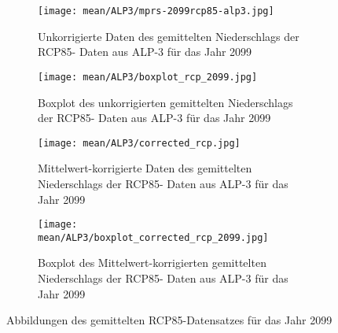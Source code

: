 \begin{figure}[hbt!]
	\begin{subfigure}{0.49\textwidth}
		\texttt{[image: mean/ALP3/mprs-2099rcp85-alp3.jpg]}
		\caption{Unkorrigierte Daten des gemittelten Niederschlags der RCP85- Daten aus ALP-3 für das Jahr 2099}
		\label{fig:rcp}
	\end{subfigure}
	\begin{subfigure}{0.49\textwidth}
		\texttt{[image: mean/ALP3/boxplot\_rcp\_2099.jpg]}
		\caption{Boxplot des unkorrigierten gemittelten Niederschlags der RCP85- Daten aus ALP-3 für das Jahr 2099}
		\label{fig:boxplot_rcp}
	\end{subfigure}
	\begin{subfigure}{0.49\textwidth}
	\texttt{[image: mean/ALP3/corrected\_rcp.jpg]}
	\caption{Mittelwert-korrigierte Daten des gemittelten Niederschlags der RCP85- Daten aus ALP-3 für das Jahr 2099}
	\label{fig:corrected_rcp}
	\end{subfigure}
	\begin{subfigure}{0.49\textwidth}
		\texttt{[image: mean/ALP3/boxplot\_corrected\_rcp\_2099.jpg]}
		\caption{Boxplot des Mittelwert-korrigierten gemittelten Niederschlags der RCP85- Daten aus ALP-3 für das Jahr 2099}
		\label{fig:boxplot_corrected_rcp}
	\end{subfigure}
	\caption{Abbildungen des gemittelten RCP85-Datensatzes für das Jahr 2099}
\end{figure}